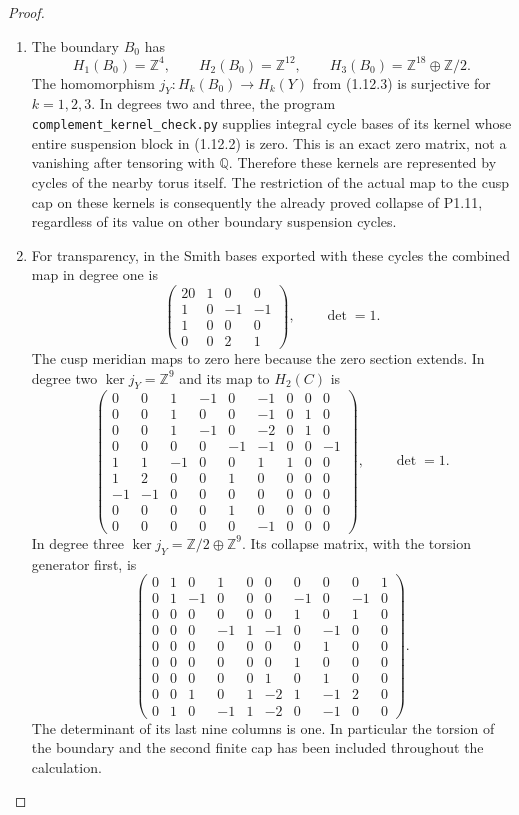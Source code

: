 \documentclass[11pt,a4paper]{article}
\theoremstyle{definition}
\begin{document}
\begin{proof}
\begin{enumerate}[label=\arabic*.]
\item The boundary $B_0$ has
\[
H_1(B_0)=\mathbb Z^4,\qquad H_2(B_0)=\mathbb Z^{12},\qquad
H_3(B_0)=\mathbb Z^{18}\oplus\mathbb Z/2.
\]
The homomorphism $j_Y:H_k(B_0)\to H_k(Y)$ from (1.12.3) is
surjective for $k=1,2,3$.  In degrees two and three, the program
\texttt{complement\_kernel\_check.py} supplies integral cycle bases
of its kernel whose entire suspension block in (1.12.2) is zero.
This is an exact zero matrix, not a vanishing after tensoring with
$\mathbb Q$.  Therefore these kernels are represented by cycles of
the nearby torus itself.  The restriction of the actual map to the
cusp cap on these kernels is consequently the already proved
collapse of P1.11, regardless of its value on other boundary
suspension cycles.

\item For transparency, in the Smith bases exported with these cycles the
combined map in degree one is
\[
\begin{pmatrix}20&1&0&0\\1&0&-1&-1\\1&0&0&0\\0&0&2&1\end{pmatrix},
\qquad\det=1.
\tag{1.12.7}
\]
The cusp meridian maps to zero here because the zero section extends.
In degree two $\ker j_Y=\mathbb Z^9$ and its map to $H_2(C)$ is
\[
\begin{pmatrix}
0&0&1&-1&0&-1&0&0&0\\
0&0&1&0&0&-1&0&1&0\\
0&0&1&-1&0&-2&0&1&0\\
0&0&0&0&-1&-1&0&0&-1\\
1&1&-1&0&0&1&1&0&0\\
1&2&0&0&1&0&0&0&0\\
-1&-1&0&0&0&0&0&0&0\\
0&0&0&0&1&0&0&0&0\\
0&0&0&0&0&-1&0&0&0
\end{pmatrix},\qquad\det=1.
\tag{1.12.8}
\]
In degree three $\ker j_Y=\mathbb Z/2\oplus\mathbb Z^9$.
Its collapse matrix, with the torsion generator first, is
\[
\begin{pmatrix}
0&1&0&1&0&0&0&0&0&1\\
0&1&-1&0&0&0&-1&0&-1&0\\
0&0&0&0&0&0&1&0&1&0\\
0&0&0&-1&1&-1&0&-1&0&0\\
0&0&0&0&0&0&0&1&0&0\\
0&0&0&0&0&0&1&0&0&0\\
0&0&0&0&0&1&0&1&0&0\\
0&0&1&0&1&-2&1&-1&2&0\\
0&1&0&-1&1&-2&0&-1&0&0
\end{pmatrix}.
\tag{1.12.9}
\]
The determinant of its last nine columns is one.  In particular the
torsion of the boundary and the second finite cap has been included
throughout the calculation.


\end{enumerate}
\end{proof}
\end{document}
